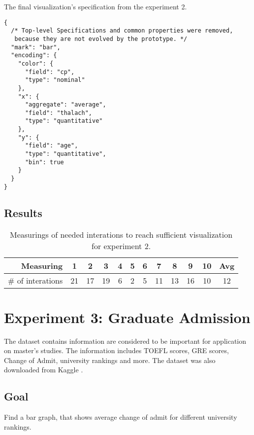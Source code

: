 
\begin{listing}[htbp]
\caption{\label{code:specification-experiment2}The final visualization's specification from the experiment 2.}
\begin{verbatim}
{
  /* Top-level Specifications and common properties were removed,
   because they are not evolved by the prototype. */
  "mark": "bar",
  "encoding": {
    "color": {
      "field": "cp",
      "type": "nominal"
    },
    "x": {
      "aggregate": "average",
      "field": "thalach",
      "type": "quantitative"
    },
    "y": {
      "field": "age",
      "type": "quantitative",
      "bin": true
    }
  }
}
\end{verbatim}
\end{listing}
\subsection{Results}

\begin{table}[htbp]
      \centering
      \caption{Measurings of needed interations to reach sufficient visualization for experiment 2.}
      \label{table:results}
          \begin{tabular}{ r | c c c c c c c c c c | c }
          \hline
              \textbf{Measuring} & \textbf{1} & \textbf{2} & \textbf{3} & \textbf{4} & \textbf{5} & \textbf{6} & \textbf{7} & \textbf{8} & \textbf{9} & \textbf{10} & \textbf{Avg} \\
          \toprule
\hline \# of interations  & 21 & 17 & 19 & 6 & 2 & 5 & 11 & 13 & 16 & 10 & 12 \\ \hline
          \end{tabular}
\end{table}

\clearpage

\section{Experiment 3: Graduate Admission}
The dataset contains information are considered to be important for application on master's studies. The information includes TOEFL scores, GRE scores, Change of Admit, university rankings and more. The dataset was also downloaded from Kaggle \cite{graduate-admission}.
\subsection{Goal}
Find a bar graph, that shows average change of admit for different university rankings.
